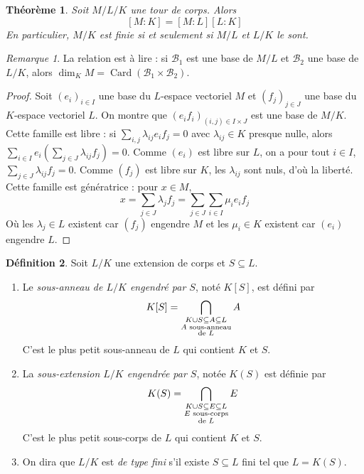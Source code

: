 \documentclass{article}
\newcommand{\base}{\mathcal{B}}
\DeclareMathOperator{\Card}{Card}
\theoremstyle{plain}
\newtheorem{theorem}{Théorème}[section]
\theoremstyle{definition}
\newtheorem{definition}[theorem]{Définition}
\theoremstyle{remark}
\newtheorem*{remark}{Remarque}
\begin{document}
\begin{theorem} \label{thmdeg}
    Soit $M/L/K$ une tour de corps. Alors
    \[[M : K] = [M : L] [L : K]\]
    En particulier, $M/K$ est finie si et seulement si $M/L$ et $L/K$ le sont.
\end{theorem}

\begin{remark}
    La relation est à lire : si $\base_1$ est une base de $M/L$ et $\base_2$ une base de $L/K$, alors $\dim_K M = \Card(\base_1 \times \base_2)$.
\end{remark}

\begin{proof}
    Soit $(e_i)_{i\in I}$ une base du $L$-espace vectoriel $M$ et $(f_j)_{j \in J}$ une base du $K$-espace vectoriel $L$. On montre que $(e_i f_i)_{(i,j) \in I \times J}$ est une base de $M/K$. \\
    Cette famille est libre : si $\sum\limits_{i,j} \lambda_{ij} e_i f_j = 0$ avec $\lambda_{ij} \in K$ presque nulle, alors $\sum\limits_{i \in I} e_i \left(\sum\limits_{j \in J} \lambda_{ij} f_j\right) = 0$. Comme $(e_i)$ est libre sur $L$, on a pour tout $i \in I$, $\sum\limits_{j \in J} \lambda_{ij} f_j = 0$. Comme $(f_j)$ est libre sur $K$, les $\lambda_{ij}$ sont nuls, d'où la liberté. Cette famille est génératrice : pour $x \in M$,
    \[x = \sum_{j\in J} \lambda_j f_j = \sum_{j \in J} \sum_{i \in I} \mu_i e_i f_j\]
    Où les $\lambda_j \in L$ existent car $(f_j)$ engendre $M$ et les $\mu_i \in K$ existent car $(e_i)$ engendre $L$.
\end{proof}

\begin{definition}
    Soit $L/K$ une extension de corps et $S \subseteq L$.
    \begin{enumerate}
        \item Le \emph{sous-anneau de $L/K$ engendré par $S$}, noté $K[S]$, est défini par
        \[K[S] = \bigcap\limits_{\begin{subarray}{c} K \cup S \subseteq A \subseteq L \\ A \text{ sous-anneau} \\ \text{de } L\end{subarray}} A\]
        C'est le plus petit sous-anneau de $L$ qui contient $K$ et $S$.
        \item La \emph{sous-extension $L/K$ engendrée par $S$}, notée $K(S)$ est définie par
        \[K(S) = \bigcap\limits_{\begin{subarray}{c} K \cup S \subseteq E \subseteq L \\ E \text{ sous-corps} \\ \text{de } L\end{subarray}} E\]
        C'est le plus petit sous-corps de $L$ qui contient $K$ et $S$.
        \item On dira que $L/K$ est \emph{de type fini} s'il existe $S \subseteq L$ fini tel que $L = K(S)$.
    \end{enumerate}
\end{definition}
\end{document}
